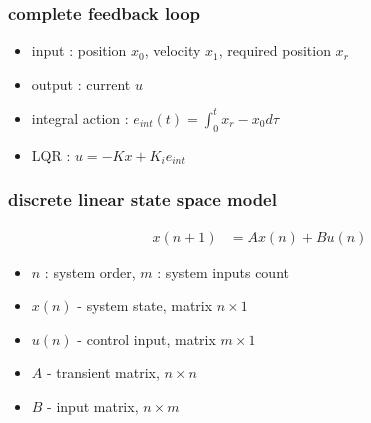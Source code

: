 \documentclass{beamer}
\begin{document}
\begin{frame}
  \frametitle{\bf complete feedback loop}


  \begin{itemize}
    \item input : position $x_0$, velocity $x_1$, required position $x_r$
    \item output : current $u$
    \item integral action : $e_{int}(t) = \int_0^t x_r - x_0 d\tau $
    \item LQR : $u = -Kx + K_ie_{int}$
  \end{itemize}
\end{frame}


\begin{frame}
  \frametitle{\bf discrete linear state space model}


  \begin{align*}
    x(n+1) &= Ax(n) + Bu(n)
  \end{align*}

  \begin{itemize}
    \item $n$ : system order, $m$ : system inputs count
    \item $x(n)$ - system state, matrix $n \times 1$
    \item $u(n)$ - control input, matrix $m \times 1$
    \item $A$    - transient matrix, $n \times n$
    \item $B$    - input matrix, $n \times m$
  \end{itemize}

\end{frame}
\end{document}
